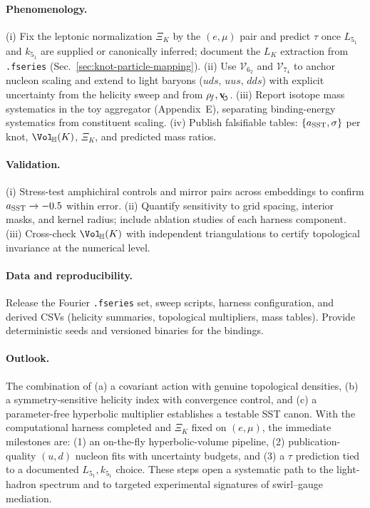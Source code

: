 \documentclass[preprint,titlepage]{revtex4-2}
\newcommand{\rhof}{\rho_{\!f}}      %
\newcommand{\swirlarrow}{\!\!\scriptsize\boldsymbol{\circlearrowleft}}
\newcommand{\vswirl}{\mathbf{v}_{\swirlarrow}}
\begin{document}
    \paragraph{Phenomenology.}
    (i) Fix the leptonic normalization \(\Xi_K\) by the \((e,\mu)\) pair and predict \(\tau\) once \(L_{5_1}\) and \(k_{5_1}\) are supplied or canonically inferred; document the \(L_K\) extraction from \texttt{.fseries} (Sec.~\ref{sec:knot-particle-mapping}).
    (ii) Use \(\mathcal{V}_{6_2}\) and \(\mathcal{V}_{7_4}\) to anchor nucleon scaling and extend to light baryons (\(uds,\,uus,\,dds\)) with explicit uncertainty from the helicity sweep and from \(\rhof,\vswirl\).
    (iii) Report isotope mass systematics in the toy aggregator (Appendix~E), separating binding-energy systematics from constituent scaling.
    (iv) Publish falsifiable tables: \(\{a_{\rm SST},\sigma\}\) per knot, \(\Vol_{\!\mathbb{H}}(K)\), \(\Xi_K\), and predicted mass ratios.

    \paragraph{Validation.}
    (i) Stress-test amphichiral controls and mirror pairs across embeddings to confirm \(a_{\rm SST}\rightarrow -0.5\) within error.
    (ii) Quantify sensitivity to grid spacing, interior masks, and kernel radius; include ablation studies of each harness component.
    (iii) Cross-check \(\Vol_{\!\mathbb{H}}(K)\) with independent triangulations to certify topological invariance at the numerical level.

    \paragraph{Data and reproducibility.}
    Release the Fourier \texttt{.fseries} set, sweep scripts, harness configuration, and derived CSVs (helicity summaries, topological multipliers, mass tables). Provide deterministic seeds and versioned binaries for the bindings.

    \paragraph{Outlook.}
    The combination of (a) a covariant action with genuine topological densities, (b) a symmetry-sensitive helicity index with convergence control, and (c) a parameter-free hyperbolic multiplier establishes a testable SST canon. With the computational harness completed and \(\Xi_K\) fixed on \((e,\mu)\), the immediate milestones are: (1) an on-the-fly hyperbolic-volume pipeline, (2) publication-quality \((u,d)\) nucleon fits with uncertainty budgets, and (3) a \(\tau\) prediction tied to a documented \(L_{5_1},k_{5_1}\) choice. These steps open a systematic path to the light-hadron spectrum and to targeted experimental signatures of swirl–gauge mediation.
\end{document}
